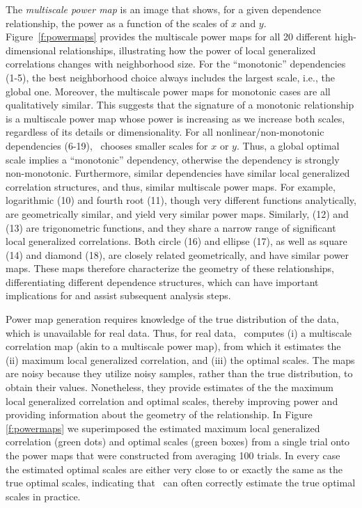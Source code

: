 \documentclass[11pt]{extarticle}
\begin{document}
The \emph{multiscale power map} is an image that shows, for a given dependence relationship, the power as a function of the scales of $x$ and $y$.
Figure~\ref{f:powermaps} provides the multiscale power maps for all 20 different high-dimensional relationships, illustrating how the power of local generalized correlations changes with  neighborhood size.
For the ``monotonic'' dependencies (1-5), the best neighborhood choice always includes the largest scale, i.e., the global one.
Moreover, the multiscale power maps for monotonic cases are all qualitatively similar.  This suggests that the signature of a monotonic relationship is a multiscale power map whose power is increasing as we increase both scales, regardless of its details or dimensionality.
For all nonlinear/non-monotonic dependencies (6-19),  \Mgc~chooses smaller scales for $x$ or $y$. Thus, a global optimal scale implies a ``monotonic'' dependency, otherwise the dependency is strongly non-monotonic.
Furthermore, similar dependencies have similar local generalized correlation structures, and thus, similar multiscale power maps. For example, logarithmic (10) and fourth root (11), though very different functions analytically, are geometrically similar, and yield very similar power maps.
Similarly,  (12) and (13) are trigonometric functions, and they share a narrow range of significant local generalized correlations.
Both circle (16) and ellipse (17), as well as square (14) and diamond (18), are closely related geometrically, and have similar power maps.
These maps therefore characterize the geometry of these relationships, differentiating different dependence structures, which can have important implications for and assist subsequent analysis steps.


Power map generation requires knowledge of the true distribution of the data, which is unavailable for real data.
Thus, for real data, \Mgc~computes (i) a multiscale correlation map  (akin to a multiscale power map), from which it estimates the (ii) maximum local generalized correlation, and (iii) the optimal scales.  The maps are noisy because they utilize noisy samples, rather than the true distribution, to obtain their values.  Nonetheless, they provide estimates of the  the maximum local generalized correlation  and optimal scales, thereby improving power and providing information about the geometry of the relationship.
In Figure \ref{f:powermaps} we superimposed the estimated maximum local generalized correlation (green dots) and optimal scales (green boxes) from a single trial onto the power maps that were constructed from averaging 100 trials.
 In every case the estimated optimal scales are either very close to or exactly the same as the true optimal scales, indicating that \Mgc~can often correctly estimate the true optimal scales in practice.
\end{document}
